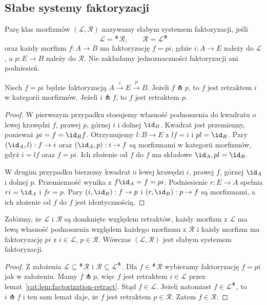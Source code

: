 \subsection{Słabe systemy faktoryzacji}

\begin{definicja}\label{cat:def:weak-factorization-system}
Parę klas morfizmów $(\mathcal L,\mathcal R)$ nazywamy słabym systemem faktoryzacji, jeśli
\[
 \mathcal L={}^{\pitchfork}\mathcal R,\qquad
 \mathcal R=\mathcal L^\pitchfork
\]
oraz każdy morfizm $f:A\to B$ ma faktoryzację $f=pi$, gdzie $i:A\to E$ należy do $\mathcal L$, a $p:E\to B$ należy do $\mathcal R$. Nie zakładamy jednoznaczności faktoryzacji ani podniesień.
\end{definicja}

\begin{lemat}\label{cat:lem:factorization-retract}
Niech $f=pi$ będzie faktoryzacją $A\xrightarrow{i}E\xrightarrow{p}B$.
Jeżeli $f\pitchfork p$, to $f$ jest retraktem $i$ w kategorii morfizmów. Jeżeli $i\pitchfork f$, to $f$ jest retraktem $p$.
\end{lemat}
\begin{proof}
W pierwszym przypadku stosujemy własność podnoszenia do kwadratu o lewej krawędzi $f$, prawej $p$, górnej $i$ i dolnej $\id_B$. Kwadrat jest przemienny, ponieważ $pi=f=\id_B f$. Otrzymujemy $l:B\to E$ z $lf=i$ i $pl=\id_B$. Pary $(\id_A,l):f\to i$ oraz $(\id_A,p):i\to f$ są morfizmami w kategorii morfizmów, gdyż $i=lf$ oraz $f=pi$. Ich złożenie od $f$ do $f$ ma składowe $\id_A,pl=\id_B$.

W drugim przypadku bierzemy kwadrat o lewej krawędzi $i$, prawej $f$, górnej $\id_A$ i dolnej $p$. Przemienność wynika z $f\id_A=f=pi$. Podniesienie $r:E\to A$ spełnia $ri=\id_A$ i $fr=p$. Pary $(i,\id_B):f\to p$ i $(r,\id_B):p\to f$ są morfizmami, a ich złożenie od $f$ do $f$ jest identycznością.
\end{proof}

\begin{stwierdzenie}\label{cat:prop:wfs-criterion}
Załóżmy, że $\mathcal L$ i $\mathcal R$ są domknięte względem retraktów, każdy morfizm z $\mathcal L$ ma lewą własność podnoszenia względem każdego morfizmu z $\mathcal R$ i każdy morfizm ma faktoryzację $pi$ z $i\in\mathcal L$, $p\in\mathcal R$. Wówczas $(\mathcal L,\mathcal R)$ jest słabym systemem faktoryzacji.
\end{stwierdzenie}
\begin{proof}
Z założenia $\mathcal L\subseteq{}^\pitchfork\mathcal R$ i $\mathcal R\subseteq\mathcal L^\pitchfork$. Dla $f\in{}^\pitchfork\mathcal R$ wybieramy faktoryzację $f=pi$ jak w założeniu. Mamy $f\pitchfork p$, więc $f$ jest retraktem $i\in\mathcal L$ przez lemat~\ref{cat:lem:factorization-retract}. Stąd $f\in\mathcal L$. Jeżeli natomiast $f\in\mathcal L^\pitchfork$, to $i\pitchfork f$ i ten sam lemat daje, że $f$ jest retraktem $p\in\mathcal R$. Zatem $f\in\mathcal R$.
\end{proof}


